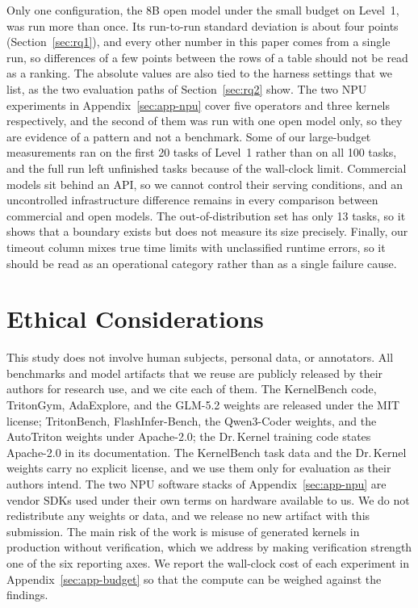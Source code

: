 \documentclass[11pt]{article}
\begin{document}
Only one configuration, the 8B open model under the small budget on Level~1, was run more than
once. Its run-to-run standard deviation is about four points (Section~\ref{sec:rq1}), and every
other number in this paper comes from a single run, so differences of a few points between the rows
of a table should not be read as a ranking. The absolute values are also tied to the harness
settings that we list, as the two evaluation paths of Section~\ref{sec:rq2} show.
The two NPU experiments in Appendix~\ref{sec:app-npu} cover five operators and three kernels
respectively, and the second of them was run with one open model only, so they are evidence of a
pattern and not a benchmark.
Some of our large-budget measurements ran on the first 20 tasks of Level~1 rather than on all 100
tasks, and the full run left unfinished tasks because of the wall-clock limit. Commercial models sit
behind an API, so we cannot control their serving conditions, and an uncontrolled infrastructure
difference remains in every comparison between commercial and open models. The out-of-distribution
set has only 13 tasks, so it shows that a boundary exists but does not measure its size precisely.
Finally, our timeout column mixes true time limits with unclassified runtime errors, so it should be
read as an operational category rather than as a single failure cause.

\section*{Ethical Considerations}

This study does not involve human subjects, personal data, or annotators. All benchmarks and
model artifacts that we reuse are publicly released by their authors for research use, and we cite
each of them. The KernelBench code, TritonGym, AdaExplore, and the GLM-5.2 weights are released under
the MIT license; TritonBench, FlashInfer-Bench, the Qwen3-Coder weights, and the AutoTriton weights
under Apache-2.0; the Dr.\,Kernel training code states Apache-2.0 in its documentation. The
KernelBench task data and the Dr.\,Kernel weights carry no explicit license, and we use them only for
evaluation as their authors intend. The two NPU software stacks of Appendix~\ref{sec:app-npu} are vendor SDKs used under their own
terms on hardware available to us. We do not redistribute any weights or data, and we release no new
artifact with this submission. The main risk of the work is misuse of generated kernels in production without
verification, which we address by making verification strength one of the six reporting axes.
We report the
wall-clock cost of each experiment in Appendix~\ref{sec:app-budget} so that the compute can be
weighed against the findings.



\appendix

\end{document}
